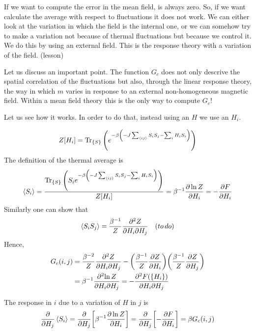 \documentclass[../main/main.tex]{subfiles}
\begin{document}
\begin{remark}
If we want to compute the error in the mean field, is always zero. So, if we want calculate the average with respect to fluctuations it does not work. We can either look at the variation in which the field is the internal one, or we can somehow try to make a variation not because of thermal fluctuations but because we control it. We do this by using an external field. This is the response theory with a variation of the field. (lesson)
\end{remark}

Let us discuss an important point. The function \( G_c \) does not only descrive the spatial correlation of the fluctuations but also, through the linear response theory, the way in which \( m \) varies in response to an external non-homogeneous magnetic field. Within a mean field theory this is the  only way to compute \( G_c \)!

Let us see how it works. In order to do that, instead using an \( H \) we use an \( H_i \).

\begin{equation}
  Z [H_i]= \Tr_{\{ S \} } \qty(e^{-\beta \qty(-J \sum_{\expval{ij} }^{} S_i S_j   - \sum_{i}^{} H_i S_i ) } )
\end{equation}
The definition of the thermal average is
\begin{equation}
  \expval{S_i} = \frac{\Tr_{\{ S \} } \qty(S_i e^{-\beta \qty(-J \sum_{\expval{ij} }^{} S_i S_j   - \sum_{i}^{} H_i S_i ) } ) }{Z[H_i]}
  = \beta ^{-1} \pdv{\ln{Z} }{H_i} = - \pdv{F}{H_i}
\end{equation}
Similarly one can show that
\begin{equation}
  \expval{S_i S_j} = \frac{\beta ^{-1}}{Z} \frac{\partial^2{Z} }{\partial{H_i} \partial{H_j}  } \quad (to \, do)
\end{equation}
Hence,
\begin{equation}
\begin{split}
  G_c (i,j) & = \frac{\beta ^{-2}}{Z}  \frac{\partial^2{Z} }{\partial{H_i} \partial{H_j}  }
  - \qty(\frac{\beta ^{-1}}{Z} \pdv{Z}{H_i} ) \qty(\frac{\beta ^{-1}}{Z} \pdv{Z}{H_j} ) \\
  & = \beta ^{-1} \frac{\partial^2{\ln{Z} } }{\partial{H_i} \partial{H_j}  }
  = - \frac{\partial^2{F(\{ H_i \}  )} }{\partial{H_i} \partial{H_j}  }
\end{split}
\end{equation}
\begin{remark}
  The response in \( i \) due to a variation of \( H \) in \( j \) is
  \begin{equation}
    \pdv{}{H_j} \expval{S_i} = \pdv{}{H_j} \qty[\beta ^{-1} \pdv{\ln{Z} }{H_i} ]  =\pdv{}{H_j} \qty[-\pdv{F}{H_i} ] =  \beta G_c (i,j)
  \end{equation}
\end{remark}
\end{document}
